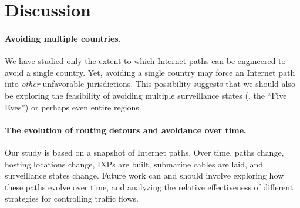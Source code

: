 \section{Discussion}
\label{discussion}

\paragraph{Avoiding multiple countries.} 
We have studied only the extent to which Internet paths can be
engineered to avoid a {single} country.  Yet, avoiding a single country
may force an Internet path into {\em other} unfavorable
jurisdictions. This possibility suggests that we should also be
exploring the feasibility of avoiding multiple surveillance states (\eg,
the ``Five Eyes'') or perhaps even entire regions. 

\paragraph{The evolution of routing detours and avoidance over time.}
Our study is based on a snapshot of Internet paths. Over time, paths
change, hosting locations change, IXPs are built, submarine cables are
laid, and surveillance states change.  Future work can and should
involve exploring how these paths evolve over time, and analyzing the
relative effectiveness of different strategies for controlling traffic flows.


